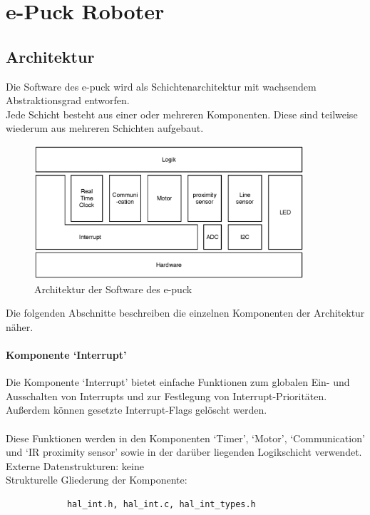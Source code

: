 \documentclass[10pt,a4paper]{article}
\let\oldsection\section
\renewcommand{\section}{\newpage \oldsection}
\begin{document}
	\section{e-Puck Roboter}
  				
		\subsection{Architektur}
		Die Software des e-puck wird als Schichtenarchitektur mit wachsendem Abstraktionsgrad entworfen. \\
		Jede Schicht besteht aus einer oder mehreren Komponenten. Diese sind teilweise wiederum aus mehreren
		Schichten aufgebaut. \\
		
		\begin{figure}[h]
			\centering
			\includegraphics[width=10cm]{images/e-puck_architecture.eps}
  			\caption{Architektur der Software des e-puck}
  		\end{figure}
		
		Die folgenden Abschnitte beschreiben die einzelnen Komponenten der Architektur näher.
		 
			\paragraph*{Komponente `Interrupt'}
			Die Komponente `Interrupt' bietet einfache Funktionen zum globalen Ein- und Ausschalten von Interrupts und zur Festlegung
			von Interrupt-Prioritäten. Außerdem können gesetzte Interrupt-Flags gelöscht werden. \\ \\
			Diese Funktionen werden in den Komponenten `Timer', `Motor', `Communication' und `IR proximity sensor' sowie
			in der darüber liegenden Logikschicht verwendet. \\
			
			Externe Datenstrukturen: keine \\
			
			Strukturelle Gliederung der Komponente:
			\begin{verbatim}  
			hal_int.h, hal_int.c, hal_int_types.h
			\end{verbatim}
\end{document}
